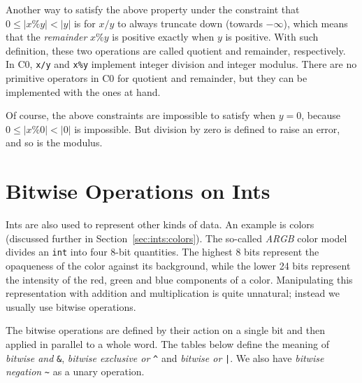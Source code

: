 \begin{gram}
Another way to satisfy the above property under the constraint that $0
\leq |x\%y| < |y|$ is for $x/y$ to always truncate down (towards
$-\infty$), which means that the \emph{remainder} $x\%y$ is positive
exactly when $y$ is positive.  With such definition, these two
operations are called quotient and remainder, respectively.  In C0,
\lstinline'x/y' and
\lstinline'x%y' implement integer division and integer
modulus.  There are no primitive operators in C0 for quotient and
remainder, but they can be implemented with the ones at hand.

Of course, the above constraints are impossible to satisfy when $y=0$,
because $0\leq |x\%0| < |0|$ is impossible. But division by zero is
defined to raise an error, and so is the modulus.
\end{gram}


\section{Bitwise Operations on Ints}
\label{sec:ints:bitops}

Ints are also used to represent other kinds of data.  An example is
colors (discussed further in Section~\ref{sec:ints:colors}).  The so-called
\emph{ARGB} color model divides an \lstinline'int' into four 8-bit
quantities.  The highest 8 bits represent the opaqueness of the color
against its background, while the lower 24 bits represent the
intensity of the red, green and blue components of a color.
Manipulating this representation with addition and multiplication is
quite unnatural; instead we usually use bitwise operations.

The bitwise operations are defined by their action on a single bit and
then applied in parallel to a whole word.  The tables below define the
meaning of \emph{bitwise and} \lstinline'&', \emph{bitwise exclusive
  or} \lstinline'^' and \emph{bitwise or} \lstinline'|'.  We also have
\emph{bitwise negation} \lstinline'~' as a unary operation.

